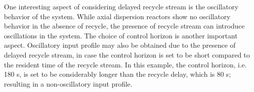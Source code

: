 One interesting aspect of considering delayed recycle stream is the oscillatory behavior of the system. While axial dispersion reactors show no oscillatory behavior in the absence of recycle, the presence of recycle stream can introduce oscillations in the system. The choice of control horizon is another important aspect. Oscillatory input profile may also be obtained due to the presence of delayed recycle stream, in case the control horizon is set to be short compared to the resident time of the recycle stream. In this example, the control horizon, i.e. 180 s, is set to be considerably longer than the recycle delay, which is 80 s; resulting in a non-oscillatory input profile.